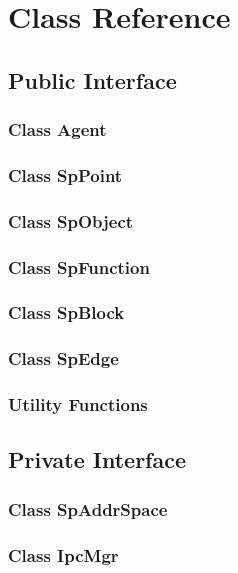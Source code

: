 \section{Class Reference}

\subsection{Public Interface}
\subsubsection{Class Agent}
\subsubsection{Class SpPoint}
\subsubsection{Class SpObject}
\subsubsection{Class SpFunction}
\subsubsection{Class SpBlock}
\subsubsection{Class SpEdge}
\subsubsection{Utility Functions}

\subsection{Private Interface}
\subsubsection{Class SpAddrSpace}
\subsubsection{Class IpcMgr}

